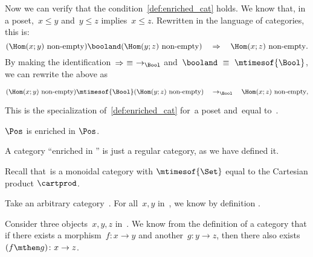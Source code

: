 {\begin{example}
        Now we can verify that the condition~\cref{def:enriched_cat} holds.
        We know that, in a poset,~$x \leq y$ and~$y \leq z$ implies~$x \leq z$.
        Rewritten in the language of categories, this is:
        \begin{equation}
            (\Hom(x;y)\ \text{non-empty})
            \booland
            (\Hom(y; z)\ \text{non-empty})
            \quad
            \Rightarrow
            \quad
            \Hom(x; z)\ \text{non-empty}.
        \end{equation}
        By making the identification~$\Rightarrow\ \equiv\ \to_{\Bool}$ and~$\booland\ \equiv\ \mtimesof{\Bool}$, we can rewrite the above as
        \begin{widepar}
            \begin{equation}
                (\Hom(x;y)\ \text{non-empty})
                \mtimesof{\Bool}
                (\Hom(y; z)\ \text{non-empty})
                \quad
                \to_{\Bool}
                \quad
                \Hom(x; z)\ \text{non-empty},
            \end{equation}
        \end{widepar}
        This is the specialization of~\cref{def:enriched_cat} for~\CatC a poset and~\CatD equal to~\Bool.
    \end{example}
    \begin{example}
        $\Pos$ is enriched in $\Pos$.
    \end{example}

    \begin{example}
    \end{example}

    \begin{example}
        A category ``enriched in \Set'' is just a regular category, as we have defined it.

        Recall that~\Set is a monoidal category with $\mtimesof{\Set}$ equal to the Cartesian product $\cartprod$.

        Take an arbitrary category~\CatC.
        For all~$x, y$ in~\CatC, we know by definition .

        Consider three objects~$x,y,z$ in~\CatC.
        We know from the definition of a category that if there exists a morphism~$f: x \to y$ and another~$g: y \to z$, then there also exists~$(f\mthen g)\colon x \to z$.


\end{example}}
